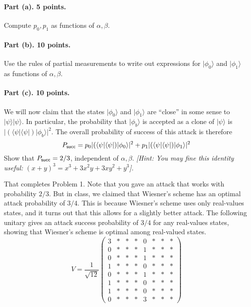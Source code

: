 \documentclass{article}
\begin{document}
\paragraph{Part (a). 5 points.} Compute $p_0,p_1$ as functions of $\alpha,\beta$.

\paragraph{Part (b). 10 points.} Use the rules of partial measurements to write out expressions for $|\phi_0\rangle$ and $|\phi_1\rangle$ as functions of $\alpha,\beta$.

\paragraph{Part (c). 10 points.} We will now claim that the states $|\phi_0\rangle$ and $|\phi_1\rangle$ are ``close'' in some sense to $|\psi\rangle|\psi\rangle$. In particular, the probability that $|\phi_b\rangle$ is accepted as a clone of $|\psi\rangle$ is $|(\langle\psi|\langle\psi|)|\phi_b\rangle|^2$. The overall probability of success of this attack is therefore \[P_{\sf succ}=p_0|(\langle\psi|\langle\psi|)|\phi_0\rangle|^2+p_1|(\langle\psi|\langle\psi|)|\phi_1\rangle|^2 \]
Show that $P_{\sf succ}=2/3$, independent of $\alpha,\beta$. \emph{[Hint: You may fine this identity useful: $(x+y)^3=x^3+3x^2 y+3x y^2+y^3$].}

\medskip

\begin{remark}That completes Problem 1. Note that you gave an attack that works with probability $2/3$. But in class, we claimed that Wiesner's scheme has an optimal attack probability of $3/4$. This is because Wiesner's scheme uses only real-values states, and it turns out that this allows for a slightly better attack. The following unitary gives an attack success probability of $3/4$ for any real-values states, showing that Wiesner's scheme is optimal among real-valued states.
\[V=\frac{1}{\sqrt{12}}\left(\begin{array}{cccccccc}
3&*&*&*&0&*&*&*\\
0&*&*&*&1&*&*&*\\
0&*&*&*&1&*&*&*\\
1&*&*&*&0&*&*&*\\
0&*&*&*&1&*&*&*\\
1&*&*&*&0&*&*&*\\
1&*&*&*&0&*&*&*\\
0&*&*&*&3&*&*&*
\end{array}\right)\]
\end{remark}
\end{document}
